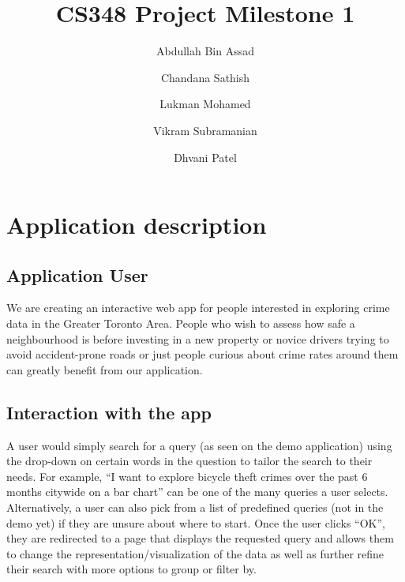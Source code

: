\documentclass[12pt, a4paper]{article}
\title{CS348 Project Milestone 1}
\author{Abdullah Bin Assad\and Chandana Sathish \and Lukman Mohamed \and Vikram Subramanian \and Dhvani Patel}
\begin{document}
\maketitle

\section*{Application description}
\subsection*{Application User}
We are creating an interactive web app for people interested in exploring crime data in the Greater Toronto Area. People who wish to assess how safe a neighbourhood is before investing in a new property or novice drivers trying to avoid accident-prone roads or just people curious about crime rates around them can greatly benefit from our application.
\subsection*{Interaction with the app}
A user would simply search for a query (as seen on the demo application) using the drop-down on certain words in the question to tailor the search to their needs. For example, “I want to explore bicycle theft crimes over the past 6 months citywide on a bar chart” can be one of the many queries a user selects. Alternatively, a user can also pick from a list of predefined queries (not in the demo yet) if they are unsure about where to start. Once the user clicks “OK”, they are redirected to a page that displays the requested query and allows them to change the representation/visualization of the data as well as further refine their search with more options to group or filter by.
\end{document}
